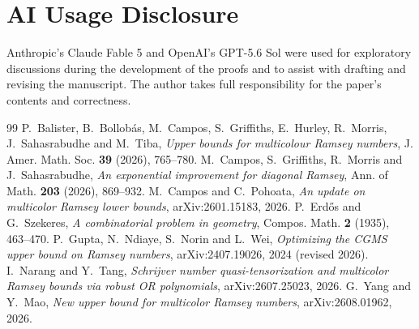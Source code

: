 \documentclass[11pt]{article}
\theoremstyle{definition}
\begin{document}
\section*{AI Usage Disclosure}

Anthropic's Claude Fable 5 and OpenAI's GPT-5.6 Sol were used for
exploratory discussions during the development of the proofs and to assist
with drafting and revising the manuscript.  The author takes full
responsibility for the paper's contents and correctness.

\begin{thebibliography}{99}
P.~Balister, B.~Bollob\'as, M.~Campos, S.~Griffiths, E.~Hurley, R.~Morris,
J.~Sahasrabudhe and M.~Tiba,
\emph{Upper bounds for multicolour Ramsey numbers},
J. Amer. Math. Soc. \textbf{39} (2026), 765--780.
M.~Campos, S.~Griffiths, R.~Morris and J.~Sahasrabudhe,
\emph{An exponential improvement for diagonal Ramsey},
Ann. of Math. \textbf{203} (2026), 869--932.
M.~Campos and C.~Pohoata,
\emph{An update on multicolor Ramsey lower bounds},
arXiv:2601.15183, 2026.
P.~Erd\H{o}s and G.~Szekeres,
\emph{A combinatorial problem in geometry},
Compos. Math. \textbf{2} (1935), 463--470.
P.~Gupta, N.~Ndiaye, S.~Norin and L.~Wei,
\emph{Optimizing the CGMS upper bound on Ramsey numbers},
arXiv:2407.19026, 2024 (revised 2026).
I.~Narang and Y.~Tang,
\emph{Schrijver number quasi-tensorization and multicolor Ramsey bounds via robust OR polynomials},
arXiv:2607.25023, 2026.
G.~Yang and Y.~Mao,
\emph{New upper bound for multicolor Ramsey numbers},
arXiv:2608.01962, 2026.
\end{thebibliography}
\end{document}
